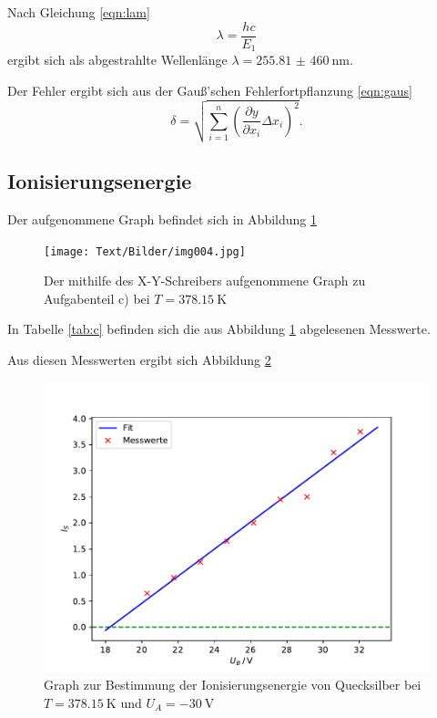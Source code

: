 Nach Gleichung \eqref{eqn:lam}
\begin{equation*}
  \lambda = \frac{h c}{E_1}
  \label{eqn:lam}
\end{equation*}
ergibt sich als abgestrahlte Wellenlänge $\lambda = \SI{255,81(460)}{\nm}$.

Der Fehler ergibt sich aus der Gauß'schen Fehlerfortpflanzung \eqref{eqn:gaus}
\begin{equation}
   \delta = \sqrt{ \sum_{i=1}^{n}(\frac{\partial y}{\partial x_i} \Delta x_i)^2}.
   \label{eqn:gaus}
 \end{equation}

\subsection{Ionisierungsenergie \label{sec:c}}
Der aufgenommene Graph befindet sich in Abbildung \ref{fig:c}
\begin{figure}[H]
  \centering
  \texttt{[image: Text/Bilder/img004.jpg]}
  \caption{Der mithilfe des X-Y-Schreibers aufgenommene Graph zu Aufgabenteil c) bei $T = \SI{378,15}{\K}$}
  \label{fig:c}
\end{figure}

In Tabelle \ref{tab:c} befinden sich die aus Abbildung \ref{fig:c} abgelesenen Messwerte.


Aus diesen Messwerten ergibt sich Abbildung \ref{fig:c2}
\begin{figure}[H]
  \centering
  \includegraphics[width=.9\textwidth]{Plots/c.pdf}
  \caption{Graph zur Bestimmung der Ionisierungsenergie von Quecksilber bei $T = \SI{378,15}{\K}$ und $U_A = \SI{-30}{\V}$}
  \label{fig:c2}
\end{figure}

